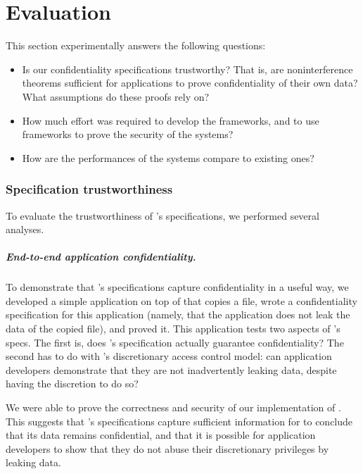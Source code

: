 \chapter{Evaluation}
This section experimentally answers the following questions:

\begin{itemize}

\item
  Is our confidentiality specifications trustworthy?  That is, are noninterference theorems sufficient for applications to prove confidentiality of their own data?
  What assumptions do these proofs rely on?

\item
  How much effort was required to develop the frameworks, and to use frameworks to prove the security of the systems?

\item 
  How are the performances of the systems compare to existing ones?
\end{itemize}

\subsection{Specification trustworthiness}

To evaluate the trustworthiness of \sfscq's specifications, we performed several
analyses.


\paragraph{End-to-end application confidentiality.}

To demonstrate that \sfscq's specifications capture confidentiality in
a useful way, we developed a simple application on top of \sfscq that
copies a file, wrote a confidentiality specification for this application
(namely, that the application does not leak the data of the copied
file), and proved it.  This application tests two aspects of \sfscq's
specs.  The first is, does \sfscq's specification actually guarantee
confidentiality?  The second has to do with \sfscq's discretionary access
control model: can application developers demonstrate that they are not
inadvertently leaking data, despite having the discretion to do so?

We were able to prove the correctness and security of our implementation
of .  This suggests that \sfscq's specifications capture sufficient
information for  to conclude that its data remains confidential,
and that it is possible for application developers to show that they do
not abuse their discretionary privileges by leaking data.



